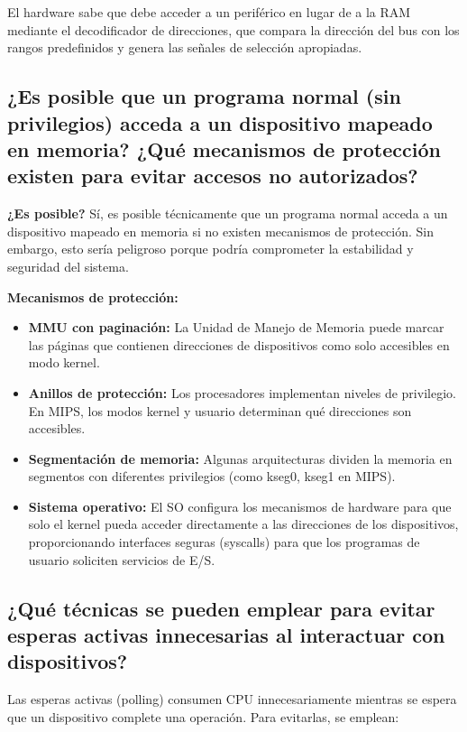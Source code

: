 \documentclass[12pt]{article}
\begin{document}
	El hardware sabe que debe acceder a un periférico en lugar de a la RAM mediante el decodificador de direcciones, que compara la dirección del bus con los rangos predefinidos y genera las señales de selección apropiadas.
	
\subsection{¿Es posible que un programa normal (sin privilegios) acceda a un dispositivo mapeado en memoria? ¿Qué mecanismos de protección existen para evitar accesos no autorizados?}

	\textbf{¿Es posible?} Sí, es posible técnicamente que un programa normal acceda a un dispositivo mapeado en memoria si no existen mecanismos de protección. Sin embargo, esto sería peligroso porque podría comprometer la estabilidad y seguridad del sistema.
	
	\textbf{Mecanismos de protección:}
	\begin{itemize}
		\item \textbf{MMU con paginación:} La Unidad de Manejo de Memoria puede marcar las páginas que contienen direcciones de dispositivos como solo accesibles en modo kernel.
		\item \textbf{Anillos de protección:} Los procesadores implementan niveles de privilegio. En MIPS, los modos kernel y usuario determinan qué direcciones son accesibles.
		\item \textbf{Segmentación de memoria:} Algunas arquitecturas dividen la memoria en segmentos con diferentes privilegios (como kseg0, kseg1 en MIPS).
		\item \textbf{Sistema operativo:} El SO configura los mecanismos de hardware para que solo el kernel pueda acceder directamente a las direcciones de los dispositivos, proporcionando interfaces seguras (syscalls) para que los programas de usuario soliciten servicios de E/S.
	\end{itemize}
	
\subsection{¿Qué técnicas se pueden emplear para evitar esperas activas innecesarias al interactuar con dispositivos?}

Las esperas activas (polling) consumen CPU innecesariamente mientras se espera que un dispositivo complete una operación. Para evitarlas, se emplean:
\end{document}
